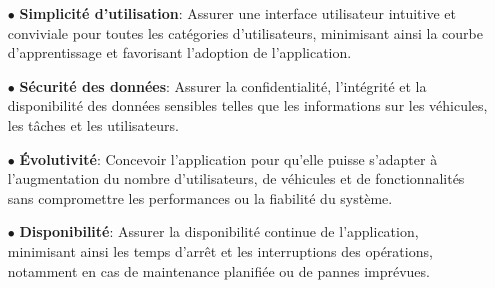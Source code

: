     \begin{itemize}
    \item[$\bullet$] \textbf {Simplicité d'utilisation}:  Assurer une interface utilisateur intuitive et conviviale pour toutes les catégories d'utilisateurs, minimisant ainsi la courbe d'apprentissage et favorisant l'adoption de l'application.\\

    \item[$\bullet$] \textbf {Sécurité des données}: Assurer la confidentialité, l'intégrité et la disponibilité des données sensibles telles que les informations sur les véhicules, les tâches et les utilisateurs.\\

    \item[$\bullet$] \textbf {Évolutivité}: Concevoir l'application pour qu'elle puisse s'adapter à l'augmentation du nombre d'utilisateurs, de véhicules et de fonctionnalités sans compromettre les performances ou la fiabilité du système.\\

    \item[$\bullet$] \textbf {Disponibilité}:  Assurer la disponibilité continue de l'application, minimisant ainsi les temps d'arrêt et les interruptions des opérations, notamment en cas de maintenance planifiée ou de pannes imprévues.\\
     
    
    \end{itemize}





